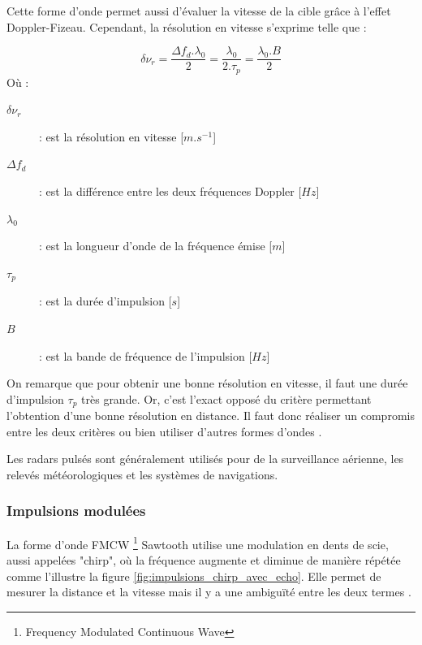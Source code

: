 Cette forme d'onde permet aussi d'évaluer la vitesse de la cible grâce à l'effet Doppler-Fizeau. Cependant, la résolution en vitesse s'exprime telle que : 

\begin{equation}
    \delta\nu_r = \frac{\Delta f_d.\lambda_0}{2} = \frac{\lambda_0}{2.\tau_p} = \frac{\lambda_0.B}{2}
    \label{eq:resolution_vitesse_impulsions}
\end{equation}
Où :
\begin{description}
    \item[$\delta\nu_r$] : est la résolution en vitesse [$m.s^{-1}$]
    \item[$\Delta f_d$] : est la différence entre les deux fréquences Doppler [$Hz$] 
    \item[$\lambda_0$] : est la longueur d'onde de la fréquence émise [$m$] 
    \item[$\tau_p$] : est la durée d'impulsion [$s$]
    \item[$B$] : est la bande de fréquence de l'impulsion [$Hz$]
\end{description}

On remarque que pour obtenir une bonne résolution en vitesse, il faut une durée d'impulsion $\tau_p$ très grande. Or, c'est l'exact opposé du critère permettant l'obtention d'une bonne résolution en distance. Il faut donc réaliser un compromis entre les deux critères ou bien utiliser d'autres formes d'ondes \cite{richards2010}. 

Les radars pulsés sont généralement utilisés pour de la surveillance aérienne, les relevés météorologiques et les systèmes de navigations.

\subsubsection{Impulsions modulées}
La forme d'onde FMCW \footnote{Frequency Modulated Continuous Wave} Sawtooth utilise une modulation en dents de scie, aussi appelées "chirp", où la fréquence augmente et diminue de manière répétée comme l'illustre la figure \ref{fig:impulsions_chirp_avec_echo}. Elle permet de mesurer la distance et la vitesse mais il y a une ambiguïté entre les deux termes \cite{cumming2005}.

